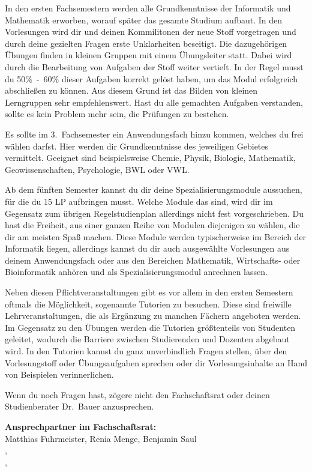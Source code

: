 In den ersten Fachsemestern werden alle Grundkenntnisse der Informatik und Mathematik erworben, worauf später das gesamte Studium aufbaut.
In den Vorlesungen wird dir und deinen Kommilitonen der neue Stoff vorgetragen und durch deine gezielten Fragen erste Unklarheiten beseitigt.
Die dazugehörigen Übungen finden in kleinen Gruppen mit einem Übungsleiter statt.
Dabei wird durch die Bearbeitung von Aufgaben der Stoff weiter vertieft.
In der Regel musst du 50\%~-~60\% dieser Aufgaben korrekt gelöst haben, um das Modul erfolgreich abschließen zu können.
Aus diesem Grund ist das Bilden von kleinen Lerngruppen sehr empfehlenswert.
Hast du alle gemachten Aufgaben verstanden, sollte es kein Problem mehr sein, die Prüfungen zu bestehen.

Es sollte im 3.~Fachsemester ein Anwendungsfach hinzu kommen, welches du frei wählen darfst.
Hier werden dir Grundkenntnisse des jeweiligen Gebietes vermittelt.
Geeignet sind beispielsweise Chemie, Physik, Biologie, Mathematik, Geowissenschaften, Psychologie, BWL oder VWL.

Ab dem fünften Semester kannst du dir deine Spezialisierungsmodule aussuchen, für die du 15 LP aufbringen musst.
Welche Module das sind, wird dir im Gegensatz zum übrigen Regelstudienplan allerdings nicht fest vorgeschrieben.
Du hast die Freiheit, aus einer ganzen Reihe von Modulen diejenigen zu wählen, die dir am meisten Spaß machen.
Diese Module werden typischerweise im Bereich der Informatik liegen, allerdings kannst du dir auch ausgewählte Vorlesungen aus deinem Anwendungsfach oder aus den Bereichen Mathematik, Wirtschafts- oder Bioinformatik anhören und als Spezialisierungsmodul anrechnen lassen.

Neben diesen Pflichtveranstaltungen gibt es vor allem in den ersten Semestern oftmals die Möglichkeit, sogenannte Tutorien zu besuchen.
Diese sind freiwille Lehrveranstaltungen, die als Ergänzung zu manchen Fächern angeboten werden.
Im Gegensatz zu den Übungen werden die Tutorien größtenteils von Studenten geleitet, wodurch die Barriere zwischen Studierenden und Dozenten abgebaut wird.
In den Tutorien kannst du ganz unverbindlich Fragen stellen, über den Vorlesungstoff oder Übungsaufgaben sprechen oder dir Vorlesungsinhalte an Hand von Beispielen verinnerlichen.

Wenn du noch Fragen hast, zögere nicht den Fachschaftsrat oder deinen Studienberater Dr.~Bauer anzusprechen.

\textbf{Ansprechpartner im Fachschaftsrat:}\\
Matthias Fuhrmeister, Renia Menge, Benjamin Saul\\
,\\
,\\

